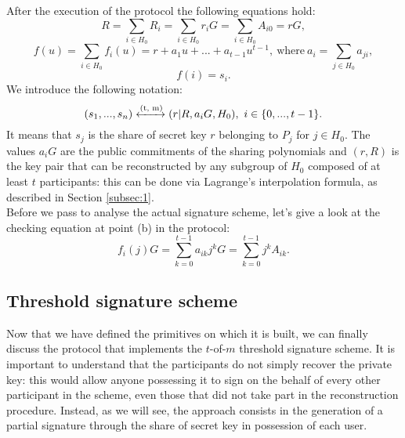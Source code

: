 After the execution of the protocol the following equations hold:
$$R = \sum_{i \in H_0} R_i = \sum_{i \in H_0}r_iG = \sum_{i \in H_0}A_{i0} = rG,$$
$$f(u) = \sum_{i \in H_0} f_i(u) = r + a_1u + ... + a_{t - 1}u^{t - 1}, \ \text{where} \ a_i = \sum_{j \in H_0}a_{ji},$$
$$f(i) = s_i.$$
We introduce the following notation: 
$$(s_1, ..., s_n) \xleftrightarrow{\text{(t, m)}} (r|R, a_iG, H_0), \ i \in \{0, ..., t - 1\}.$$
It means that $s_j$ is the share of secret key $r$ belonging to $P_j$ for $j \in H_0$. The values $a_iG$
are the public commitments of the sharing polynomials and $(r, R)$ is the key pair that can be reconstructed by any subgroup of $H_0$ composed of at least $t$ participants: this can be done via Lagrange's interpolation formula, as described in Section \ref{subsec:1}.
\\
Before we pass to analyse the actual signature scheme, let's give a look at the checking equation at point (b) in the protocol:
$$f_i(j)G = \sum_{k = 0}^{t - 1}a_{ik}j^kG = \sum_{k = 0}^{t - 1}j^kA_{ik}.$$

\bigskip

\subsection{Threshold signature scheme}
Now that we have defined the primitives on which it is built, we can finally discuss the protocol that implements the $t$-of-$m$ threshold signature scheme. It is important to understand that the participants do not simply recover the private key: this would allow anyone possessing it to sign on the behalf of every other participant in the scheme, even those that did not take part in the reconstruction procedure. Instead, as we will see, the approach consists in the generation of a partial signature through the share of secret key in possession of each user.

